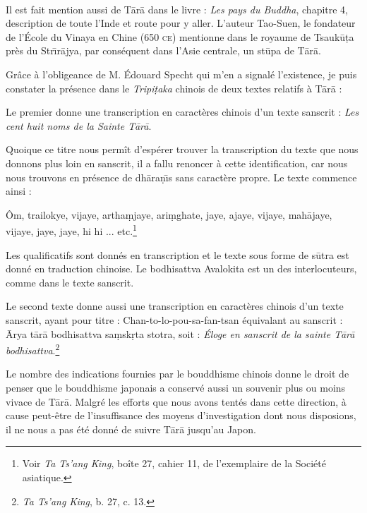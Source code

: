 \documentclass[a4paper, 11pt, oneside, french]{article}
\begin{document}
\paragraph{}
Il est fait mention aussi de T\={a}r\={a} dans le livre : \emph{Les pays du Buddha}, chapitre 4, description de toute l'Inde et route pour y aller. L'auteur Tao-Suen, le fondateur de l'École du Vinaya en Chine (650 \textsc{ce}) mentionne dans le royaume de Tsauk\={u}\d{t}a près du Str\={\i}r\={a}jya, par conséquent dans l'Asie centrale, un st\={u}pa de T\={a}r\={a}.

Grâce à l'obligeance de M. Édouard Specht qui m'en a signalé l'existence, je puis constater la présence dans le \emph{Tripi\d{t}aka} chinois de deux textes relatifs à T\={a}r\={a} :

Le premier donne une transcription en caractères chinois d'un texte sanscrit : \emph{Les cent huit noms de la Sainte T\={a}r\={a}}.

Quoique ce titre nous permît d'espérer trouver la transcription du texte que nous donnons plus loin en sanscrit, il a fallu renoncer à cette identification, car nous nous trouvons en présence de dh\={a}ra\d{n}\={\i}s sans caractère propre. Le texte commence ainsi :

Ôm, trailokye, vijaye, artha\d{m}jaye, ari\d{m}ghate, jaye, ajaye, vijaye, mah\={a}jaye, vijaye, jaye, jaye, hi hi ... etc.\footnote{Voir \emph{Ta Ts'ang King}, boîte 27, cahier 11, de l'exemplaire de la Société asiatique.}

Les qualificatifs sont donnés en transcription et le texte sous forme de s\={u}tra est donné en traduction chinoise. Le bodhisattva Avalokita est un des interlocuteurs, comme dans le texte sanscrit.

Le second texte donne aussi une transcription en caractères chinois d'un texte sanscrit, ayant pour titre : Chan-to-lo-pou-sa-fan-tsan équivalant au sanscrit : \={A}rya t\={a}r\={a} bodhisattva sa\d{m}sk\d{r}ta stotra, soit : \emph{Éloge en sanscrit de la sainte T\={a}r\={a} bodhisattva}.\footnote{\emph{Ta Ts'ang King}, b. 27, c. 13.}

Le nombre des indications fournies par le bouddhisme chinois donne le droit de penser que le bouddhisme japonais a conservé aussi un souvenir plus ou moins vivace de T\={a}r\={a}. Malgré les efforts que nous avons tentés dans cette direction, à cause peut-être de l'insuffisance des moyens d'investigation dont nous disposions, il ne nous a pas été donné de suivre T\={a}r\={a} jusqu'au Japon.
\end{document}
